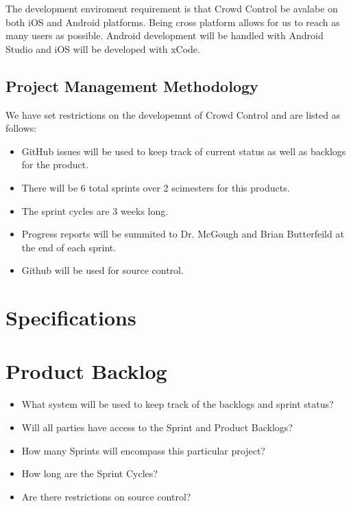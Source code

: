 The development enviroment requirement is that Crowd Control be avalabe on both iOS and Android platforms. Being cross platform allows for us to reach as many users as possible. Android development will be handled with Android Studio and iOS will be developed with xCode.


\subsection{Project  Management Methodology}

We have set restrictions on the developemnt of Crowd Control and are listed as follows:
 
\begin{itemize}
\item GitHub issues will be used to keep track of current status as well as backlogs for the product.
\item There will be 6 total sprints over 2 scimesters for this products.
\item The sprint cycles are 3 weeks long.
\item Progress reports will be summited to Dr. McGough and Brian Butterfeild at the end of each sprint.
\item Github will be used for source control. 
\end{itemize}


\section{Specifications}

\section{Product Backlog}

 
\begin{itemize}
\item What system will be used to keep track of the backlogs and sprint status?
\item Will all parties have access to the Sprint and Product Backlogs?
\item How many Sprints will encompass this particular project?
\item How long are the Sprint Cycles?
\item Are there restrictions on source control? 
\end{itemize}


